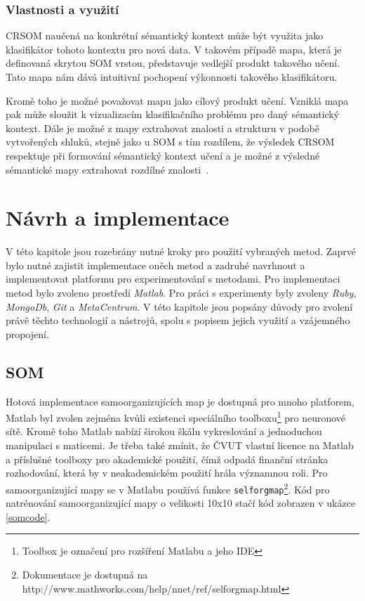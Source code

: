 \documentclass[thesis=M,czech]{FITthesis}[2012/06/26]
\begin{document}
\subsection{Vlastnosti a využití}

	CRSOM naučená na konkrétní sémantický kontext může být využita jako klasifikátor tohoto kontextu pro nová data. V takovém případě mapa, která je definovaná skrytou SOM vrstou, představuje vedlejší produkt takového učení. Tato mapa nám dává intuitivní pochopení výkonnosti takového klasifikátoru.

Kromě toho je možné považovat mapu jako cílový produkt učení. Vzniklá mapa pak může sloužit k vizualizacím klasifikačního problému pro daný sémantický kontext. Dále je možné z mapy extrahovat znalosti a strukturu v podobě vytvořených shluků, stejně jako u SOM s tím rozdílem, že výsledek CRSOM respektuje při formování sémantický kontext učení a je možné z výsledné sémantické mapy extrahovat rozdílné znalosti~\cite{lms}.

\chapter{Návrh a implementace}\label{navrhimpl}
V této kapitole jsou rozebrány nutné kroky pro použití vybraných metod. Zaprvé bylo nutné zajistit implementace oněch metod a zadruhé navrhnout a implementovat platformu pro experimentování s metodami. Pro implementaci metod bylo zvoleno prostředí \textit{Matlab}. Pro práci s experimenty byly zvoleny \textit{Ruby}, \textit{MongoDb}, \textit{Git} a \textit{MetaCentrum}. V této kapitole jsou popsány důvody pro zvolení právě těchto technologií a nástrojů, spolu s popisem jejich využití a vzájemného propojení. 


\section{SOM}\label{sec:som_impl}
Hotová implementace samoorganizujících map je dostupná pro mnoho platforem, Matlab byl zvolen zejména kvůli existenci speciálního toolboxu\footnote{Toolbox je označení pro rozšíření Matlabu a jeho IDE} pro neuronové sítě. Kromě toho Matlab nabízí širokou škálu vykreslování a jednoduchou manipulaci s maticemi. Je třeba také zmínit, že ČVUT vlastní licence na Matlab a příslušné toolboxy pro akademické použití, čímž odpadá finanční stránka rozhodování, která by v neakademickém použití hrála významnou roli.
Pro samoorganizující mapy se v Matlabu používá funkce \texttt{selforgmap}\footnote{Dokumentace je dostupná na http://www.mathworks.com/help/nnet/ref/selforgmap.html}. Kód pro natrénování samoorganizující mapy o velikosti 10x10 stačí kód zobrazen v ukázce \ref{somcode}.
\end{document}
